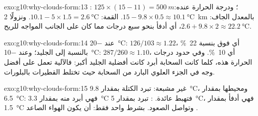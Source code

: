 \begin{solution}{exo:g10:why-clouds-form:13}
: $125 \times (15 - 11) = \qty{500}{m}$؛ ودرجة الحرارة عنده:
$15 - 9.8 \times 0.5 \approx \qty{10.1}{\degreeCelsius}$. القمة: $10.1 - 5
\times 1.5 = \qty{2.6}{\degreeCelsius}$. ونزولًا \qty{2}{km} بالمعدل الجاف:
$2.6 + 9.8 \times 2 \approx \qty{22.2}{\degreeCelsius}$، أي أدفأ بنحو سبع درجات
مما كان على الجانب المواجه للريح.
\end{solution}

\begin{solution}{exo:g10:why-clouds-form:14}
عند \qty{-20}{\degreeCelsius}: $126/103 \approx 1.22$، أي فوق  بنسبة
\qty{22}{\percent} بالنسبة إلى الجليد؛ وعند \qty{-10}{\degreeCelsius}: $287/260 \approx
1.10$، أي \qty{10}{\percent}. وفي حدود درجات الحرارة هذه، كلما كانت السحابة أبرد
كانت أفضلية الجليد أكبر: فالآلية تعمل على أفضل وجه في الجزء العلوي البارد من
السحابة حيث تختلط القطيرات بالبلورات.
\end{solution}

\begin{solution}{exo:g10:why-clouds-form:15}
غير مشبعة: تبرد الكتلة بمقدار \qty{9.8}{\degreeCelsius}، ومحيطها بمقدار
\qty{6.5}{\degreeCelsius}: فهي أبرد منه بمقدار \qty{3.3}{\degreeCelsius} فتهبط
عائدة. : تبرد بمقدار \qty{5}{\degreeCelsius}، فهي أدفأ بمقدار
\qty{1.5}{\degreeCelsius} وتواصل الصعود.  بشرط واحد فقط: أن
يكون الهواء الصاعد .
\end{solution}


